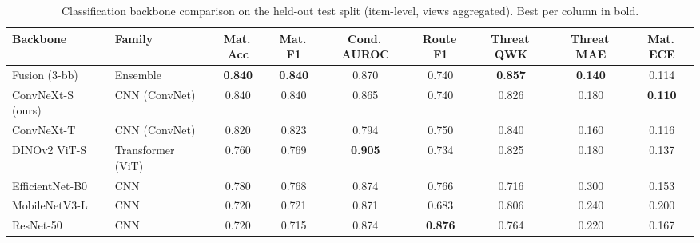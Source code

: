 \begin{table}[t]
\centering
\caption{Classification backbone comparison on the held-out test split (item-level, views aggregated). Best per column in bold.}
\label{tab:cls_compare}
\begin{tabular}{llccccccc}
\toprule
Backbone & Family & Mat.\,Acc & Mat.\,F1 & Cond.\,AUROC & Route\,F1 & Threat\,QWK & Threat\,MAE & Mat.\,ECE \\
\midrule
Fusion (3-bb) & Ensemble & \textbf{0.840} & \textbf{0.840} & 0.870 & 0.740 & \textbf{0.857} & \textbf{0.140} & 0.114 \\
ConvNeXt-S (ours) & CNN (ConvNet) & 0.840 & 0.840 & 0.865 & 0.740 & 0.826 & 0.180 & \textbf{0.110} \\
ConvNeXt-T & CNN (ConvNet) & 0.820 & 0.823 & 0.794 & 0.750 & 0.840 & 0.160 & 0.116 \\
DINOv2 ViT-S & Transformer (ViT) & 0.760 & 0.769 & \textbf{0.905} & 0.734 & 0.825 & 0.180 & 0.137 \\
EfficientNet-B0 & CNN & 0.780 & 0.768 & 0.874 & 0.766 & 0.716 & 0.300 & 0.153 \\
MobileNetV3-L & CNN & 0.720 & 0.721 & 0.871 & 0.683 & 0.806 & 0.240 & 0.200 \\
ResNet-50 & CNN & 0.720 & 0.715 & 0.874 & \textbf{0.876} & 0.764 & 0.220 & 0.167 \\
\bottomrule
\end{tabular}
\end{table}
